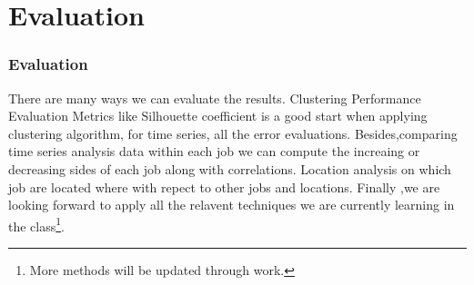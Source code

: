 \documentclass[10pt,mathserif]{beamer}
\begin{document}
	\section{Evaluation}
\begin{frame}
	\frametitle{Evaluation}
There are many ways we can evaluate the results. Clustering Performance Evaluation Metrics like Silhouette coefficient is  a good start when applying clustering algorithm, for time series, all the error evaluations.   Besides,comparing time series analysis data within each job we can compute the increaing or decreasing sides of each job along with correlations. Location analysis on which job are located where with repect to other jobs and locations. Finally ,we are looking forward to apply all the relavent techniques we are currently learning in the class\footnote{More methods will be updated through work.}. \\

\end{frame}
	
\end{document}
